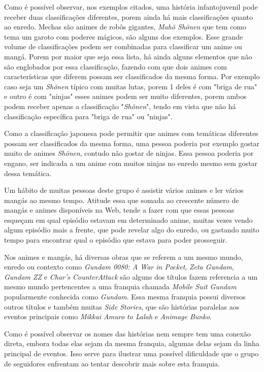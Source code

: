 \documentclass[
	12pt,				%
	openright,			%
	twoside,			%
	a4paper,			%
	Times,
	brazil,				%
	]{abntex2}
\begin{document}
Como é possível observar, nos exemplos citados, uma história infantojuvenil pode receber duas classificações diferentes, porem ainda há mais classificações quanto ao enredo. Mechas são animes de robôs gigantes, \textit{Mah\~o Sh\~onen} que tem como tema um garoto com poderes mágicos, são alguns dos exemplos. Esse grande volume de classificações podem ser combinadas para classificar um anime ou mangá. Porem por maior que seja essa lista, há ainda alguns elementos que não são englobados por essa classificação, fazendo com que dois animes com características que diferem possam ser classificados da mesma forma. Por exemplo caso seja um \textit{Sh\~onen} típico com muitas lutas, porem 1 deles é com "briga de rua" e outro é com "ninjas" esses animes podem ser muito diferentes, porem ambos podem receber apenas a classificação "\textit{Sh\~onen}", tendo em vista que não há classificação específica para "briga de rua" ou "ninjas".
\par

Como a classificação japonesa pode permitir que animes com temáticas diferentes possam ser classificados da mesma forma, uma pessoa poderia por exemplo gostar muito de animes \textit{Sh\~onen}, contudo não gostar de ninjas. Essa pessoa poderia por engano, ser indicada a um anime com muitos ninjas no enredo mesmo sem gostar dessa temática.
\par

Um hábito de muitas pessoas deste grupo é assistir vários animes e ler vários mangás ao mesmo tempo. Atitude essa que somada ao crescente número de mangás e animes disponíveis na Web, tende a fazer com que essas pessoas esqueçam em qual episódio estavam em determinado anime, muitas vezes vendo algum episódio mais a frente, que pode revelar algo do enredo, ou gastando muito tempo para encontrar qual o episódio que estava para poder prosseguir.
\par

Nos animes e mangás, há diversas obras que se referem a um mesmo mundo, enredo ou contexto como \textit{Gundam 0080: A War in Pocket}, \textit{Zeta Gundam}, \textit{Gundam ZZ} e  \textit{Char's CounterAttack} são alguns dos títulos fazem referencia a um mesmo mundo pertencentes a uma franquia chamada \textit{Mobile Suit Gundam} popularmente conhecida como  \textit{Gundam}. Essa mesma franquia possui diversos outros títulos e também muitas \textit{Side Stories}, que são histórias paralelas aos eventos principais como \textit{Mikkai Amuro to Lalah} e \textit{Animage Bunko}.
\par
Como é possível observar os nomes das histórias nem sempre tem uma conexão direta, embora todas elas sejam da mesma franquia, algumas delas sejam da linha principal de eventos. Isso serve para ilustrar uma possível dificuldade que o grupo de seguidores enfrentam ao tentar descobrir mais sobre esta franquia.
\par
\end{document}
